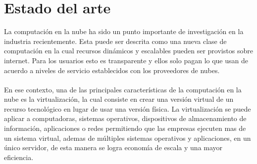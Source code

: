 
\chapter{Estado del arte}

\label{aprmaqvir}
La computación en la nube ha sido un punto importante de investigación en la industria recientemente. Esta puede ser descrita como una nueva clase de computación en la cual recursos dinámicos y escalables pueden ser provistos sobre internet. Para los usuarios esto es transparente y ellos solo pagan lo que usan de acuerdo a niveles de servicio establecidos con los proveedores de nubes.\\
\\
En ese contexto, una de las principales características de la computación en la nube es la virtualización, la cual consiste en crear una versión virtual de un recurso tecnológico en lugar de usar una versión física. La virtualización se puede aplicar a computadoras, sistemas operativos, dispositivos de almacenamiento de información, aplicaciones o redes permitiendo que las empresas ejecuten mas de un sistema virtual, ademas de múltiples sistemas operativos y aplicaciones, en un único servidor, de esta manera se logra economía de escala y una mayor eficiencia.\\
\\
